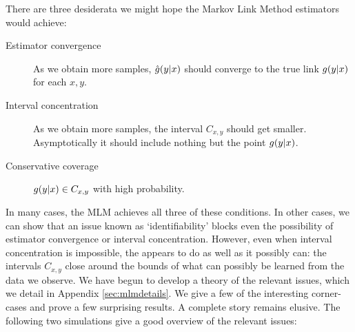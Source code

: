 There are three desiderata we might hope the Markov Link Method estimators would achieve:
\begin{description}
    \item[Estimator convergence] As we obtain more samples, $\hat {g}(y|x)$ should converge to the true link $g(y|x)$ for each $x,y$.
    \item[Interval concentration] As we obtain more samples, the interval $C_{x,y}$ should get smaller. Asymptotically it should include nothing but the point $g(y|x)$.
    \item[Conservative coverage] $g(y|x) \in C_{x,y}$ with high probability.
\end{description}
In many cases, the MLM achieves all three of these conditions.  In other cases, we can show that an issue known as `identifiability' blocks even the possibility of estimator convergence or interval concentration.  However, even when interval concentration is impossible, the \MLM{} appears to do as well as it possibly can: the intervals $C_{x,y}$ close around the bounds of what can possibly be learned from the data we observe.  We have begun to develop a theory of the relevant issues, which we detail in Appendix \ref{sec:mlmdetails}.  We give a few of the interesting corner-cases and prove a few surprising results.  A complete story remains elusive.  The following two simulations give a good overview of the relevant issues:

